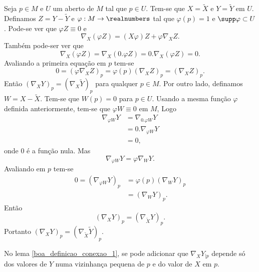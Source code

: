 \begin{demonstracao}
	Seja $p \in M$ e $U$ um aberto de $M$ tal que $p \in U$. Tem-se que $X = \tilde{X}$ e $Y = \tilde{Y}$ em $U$. Definamos $Z = Y - \tilde{Y}$ e $\varphi: M \rightarrow \realnumbers$ tal que $\varphi(p)=1$ e $\supp \varphi \subset U$. Pode-se ver que $\varphi Z \equiv 0$ e
	\begin{equation*}
		\nabla_X (\varphi Z) = (X \varphi) Z + \varphi \nabla_X Z.
	\end{equation*}
	Também pode-ser ver que
	\begin{equation*}
		\nabla_X (\varphi Z)  = \nabla_X (0 . \varphi Z) = 0 . \nabla_X (\varphi Z) = 0.
	\end{equation*}
	Avaliando a primeira equação em $p$ tem-se
	\begin{equation*}
		0 = (\varphi \nabla_X Z)_p = \varphi(p) (\nabla_X Z)_p = (\nabla_X Z)_p.
	\end{equation*}
	Então $(\nabla_X Y)_p = (\nabla_X \tilde{Y})_p$ para qualquer $p \in M$.
	Por outro lado, definamos $W = X - \tilde{X}$. Tem-se que $W(p) = 0$ para $p \in U$. Usando a mesma função $\varphi$ definida anteriormente, tem-se que $\varphi W \equiv 0$ em $M$, Logo
	\begin{align*}
		\nabla_{\varphi W} Y &= \nabla_{0 . \varphi W} Y\\
		&= 0 . \nabla_{\varphi W} Y\\
		&= 0,
	\end{align*}
	onde $0$ é a função nula. Mas
	\begin{equation*}
		\nabla_{\varphi W} Y = \varphi \nabla_W Y.
	\end{equation*}
	Avaliando em $p$ tem-se
	\begin{align*}
		0 = (\nabla_{\varphi W} Y)_p &= \varphi(p) (\nabla_W Y)_p\\
		&= (\nabla_W Y)_p.
	\end{align*}
	Então
	\begin{equation*}
		(\nabla_X Y)_p = (\nabla_{\tilde{X}} Y)_p.
	\end{equation*}
	Portanto $(\nabla_X Y)_p = (\nabla_{\tilde{X}} \tilde{Y})_p$.
\end{demonstracao}

\begin{proposicao}\label{boa_definicao_conexao_2}
	No lema \ref{boa_definicao_conexao_1}, se pode adicionar que $\nabla_X Y_{|p}$ depende só dos valores de $Y$ numa vizinhança pequena de $p$ e do valor de $X$ em $p$.
\end{proposicao}

